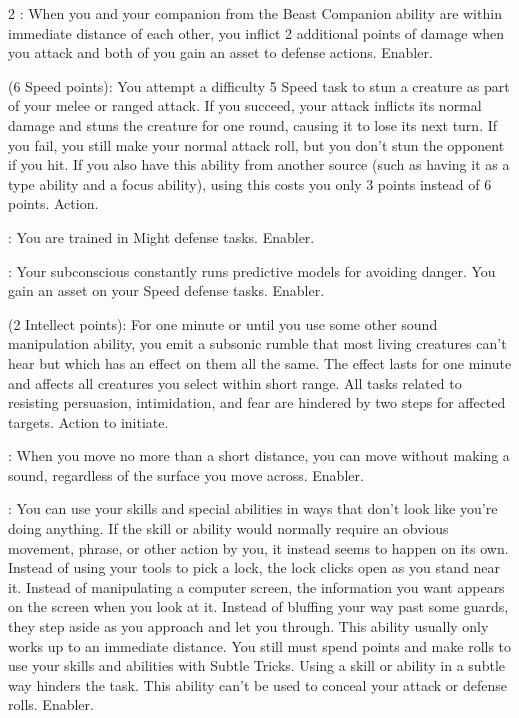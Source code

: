 \begin{multicols}{2}
: When you and your companion from the Beast Companion ability are within immediate distance of each other, you inflict 2 additional points of damage when you attack and both of you gain an asset to defense actions. Enabler. 
 
 (6 Speed points): You attempt a difficulty 5 Speed task to stun a creature as part of your melee or ranged attack. If you succeed, your attack inflicts its normal damage and stuns the creature for one round, causing it to lose its next turn. If you fail, you still make your normal attack roll, but you don’t stun the opponent if you hit. If you also have this ability from another source (such as having it as a type ability and a focus ability), using this costs you only 3 points instead of 6 points. Action. 
 
: You are trained in Might defense tasks. Enabler. 
 
: Your subconscious constantly runs predictive models for avoiding danger. You gain an asset on your Speed defense tasks. Enabler. 
 
 (2 Intellect points): For one minute or until you use some other sound manipulation ability, you emit a subsonic rumble that most living creatures can’t hear but which has an effect on them all the same. The effect lasts for one minute and affects all creatures you select within short range. All tasks related to resisting persuasion, intimidation, and fear are hindered by two steps for affected targets. Action to initiate. 
 
: When you move no more than a short distance, you can move without making a sound, regardless of the surface you move across. Enabler. 
 
: You can use your skills and special abilities in ways that don’t look like you’re doing anything. If the skill or ability would normally require an obvious movement, phrase, or other action by you, it instead seems to happen on its own. Instead of using your tools to pick a lock, the lock clicks open as you stand near it. Instead of manipulating a computer screen, the information you want appears on the screen when you look at it. Instead of bluffing your way past some guards, they step aside as you approach and let you through. This ability usually only works up to an immediate distance. You still must spend points and make rolls to use your skills and abilities with Subtle Tricks. Using a skill or ability in a subtle way hinders the task. This ability can’t be used to conceal your attack or defense rolls. Enabler. 
 

\end{multicols}
